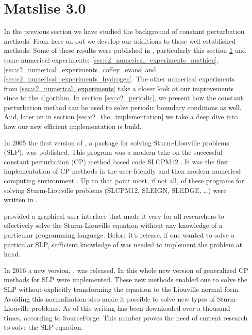 \section{Matslise 3.0}\label{sec:c2_matslise3}

In the previous section we have studied the background of constant perturbation methods. From here on out we develop our additions to these well-established methods. Some of these results were published in \cite{baeyens_fast_2020}, particularly this section \ref{sec:c2_matslise3} and some numerical experiments: \ref{sec:c2_numerical_experiments_mathieu}, \ref{sec:c2_numerical_experiments_coffey_evans} and \ref{sec:c2_numerical_experiments_hydrogen}. The other numerical experiments from \ref{sec:c2_numerical_experiments} take a closer look at our improvements since \cite{baeyens_fast_2020} to the algorithm. In section \ref{sec:c2_periodic}, we present how the constant perturbation method can be used to solve periodic boundary conditions as well. And, later on in section \ref{sec:c2_the_implementation} we take a deep dive into how our new efficient implementation is build.

In 2005 the first version of \matslise{} \cite{ledoux_matslise_2005}, a \matlab{} package for solving Sturm-Liouville problems (SLP), was published. This program was a modern take on the successful constant perturbation (CP) method based code SLCPM12 \cite{ixaru_slcpm12_1999}. It was the first implementation of CP methods in the user-friendly and then modern numerical computing environment \matlab{}. Up to that point most, if not all, of these programs for solving Sturm-Liouville problems (SLCPM12, SLEIGN, SLEDGE, \dots) \cite{ixaru_slcpm12_1999,bailey_sleign2_2001,eastham_sledge_1996} were written in \fortran{}.

\matslise{} provided a graphical user interface that made it easy for all researchers to effectively solve the Sturm-Liouville equation without any knowledge of a particular programming language. Before it's release, if one wanted to solve a particular SLP, sufficient knowledge of \fortran{} was needed to implement the problem at hand.

In 2016 a new version, \cite{ledoux_matslise_2016}, was released. In this whole new version of \matslise{} generalized CP methods for SLP were implemented. These new methods enabled one to solve the SLP without explicitly transforming the equation to the Liouville normal form. Avoiding this normalization also made it possible to solve new types of Sturm-Liouville problems. As of this writing  has been downloaded over a thousand times, according to SourceForge. This number proves the need of current research to solve the SLP equation.

